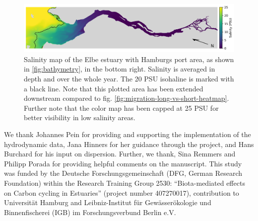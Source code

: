 \documentclass[npg, manuscript]{copernicus}
\begin{document}
\clearpage

\appendixfigures 
\begin{figure}
    \includegraphics[width=12cm]{salinity.png}
    \caption[]{
        Salinity map of the Elbe estuary with Hamburgs port area, as shown in \ref{fig:bathymetry}, in the bottom right.
        Salinity is averaged in depth and over the whole year.
        The 20 PSU isohaline is marked with a black line.
        Note that this plotted area has been extended downstream compared to fig. \ref{fig:migration-long-vs-short-heatmap}.
        Further note that the color map has been capped at 25 \unit{PSU} for better visibility in low salinity areas.
    }
    \label{fig:salinity}
\end{figure}
\clearpage








\begin{acknowledgements}
We thank Johannes Pein for providing and supporting the implementation of the hydrodynamic data, Jana Hinners for her guidance through the project, and Hans Burchard for his input on dispersion.
Further, we thank, Sina Remmers and Philipp Porada for providing helpful comments on the manuscript.
This study was funded by the Deutsche Forschungsgemeinschaft (DFG, German Research Foundation) within the Research Training Group 2530: “Biota-mediated effects on Carbon cycling in Estuaries” (project number 407270017), contribution to Universität Hamburg and Leibniz-Institut für Gewässerökologie und Binnenfischerei (IGB) im Forschungsverbund Berlin e.V.
\end{acknowledgements}
\end{document}
